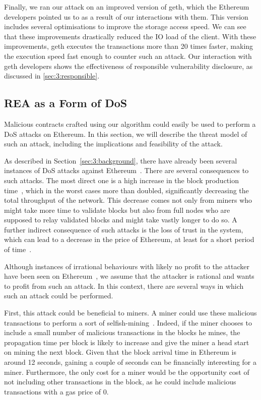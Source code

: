   Finally, we ran our attack on an improved version of geth, which the Ethereum developers pointed us to as a result of our interactions with them. This version includes several optimisations to improve the storage access speed. We can see that these improvements drastically reduced the IO load of the client. With these improvements, geth executes the transactions more than 20 times faster, making the execution speed fast enough to counter such an attack.
  Our interaction with geth developers shows the effectiveness of responsible vulnerability disclosure, as discussed in \autoref{sec:3:responsible}.

  \subsection{REA as a Form of DoS}
  Malicious contracts crafted using our algorithm could easily be used to perform a DoS attacks on Ethereum. In this section, we will describe the threat model of such an attack, including the implications and feasibility of the attack.

  As described in Section~\ref{sec:3:background}, there have already been several instances of DoS attacks against Ethereum~\cite{transaction-spam-attack,suicide-attack}.
  There are several consequences to such attacks.
  The most direct one is a high increase in the block production time~\cite{average-block-time}, which in the worst cases more than doubled, significantly decreasing the total throughput of the network.
  This decrease comes not only from miners who might take more time to validate blocks but also from full nodes who are supposed to relay validated blocks and might take vastly longer to do so.
  A further indirect consequence of such attacks is the loss of trust in the system, which can lead to a decrease in the price of Ethereum, at least for a short period of time~\cite{Chen2017Metering}.

  Although instances of irrational behaviours with likely no profit to the attacker have been seen on Ethereum~\cite{Breidenbach}, we assume that the attacker is rational and wants to profit from such an attack. In this context, there are several ways in which such an attack could be performed.

  First, this attack could be beneficial to miners. A miner could use these malicious transactions to perform a sort of selfish-mining~\cite{eyal2014majority}.
  Indeed, if the miner chooses to include a small number of malicious transactions in the blocks he mines, the propagation time per block is likely to increase and give the miner a head start on mining the next block.
  Given that the block arrival time in Ethereum is around 12 seconds, gaining a couple of seconds can be financially interesting for a miner. Furthermore, the only cost for a miner would be the opportunity cost of not including other transactions in the block, as he could include malicious transactions with a gas price of 0.

